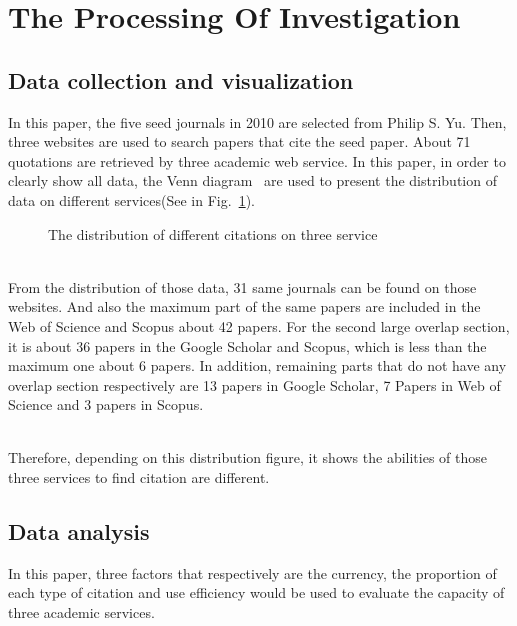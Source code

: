 \documentclass[runningheads]{llncs}
\begin{document}
\section{The Processing Of Investigation  }
\subsection{Data collection and visualization}
In this paper, the five seed journals in 2010 are selected from Philip S. Yu. Then, three websites are used to search papers that cite the seed paper. About 71 quotations are retrieved by three academic web service. In this paper, in order to clearly show all data, the Venn diagram~\cite{freiler2008interactive} are used to present the distribution of data on different services(See in Fig.~\ref{fig1}).
\begin{figure}
\centering
{}
\caption{The distribution of different citations on three service} \label{fig1}
\end{figure}
\par
\noindent
\\
From the distribution of those data,  31 same journals can be found on those websites. And also the maximum part of the same papers are included in the Web of Science and Scopus about 42 papers. For the second large overlap section, it is about 36 papers in the Google Scholar and Scopus, which is less than the maximum one about 6 papers. In addition, remaining parts that do not have any overlap section respectively are 13 papers in Google Scholar, 7 Papers in Web of Science and 3 papers in Scopus.
\par\noindent\\
Therefore, depending on this distribution figure, it shows the abilities of those three services to find citation are different. 

\subsection{Data analysis}
In this paper, three factors that respectively are the currency, the proportion of each type of citation and use efficiency would be used to evaluate the capacity of three academic services.
\end{document}
